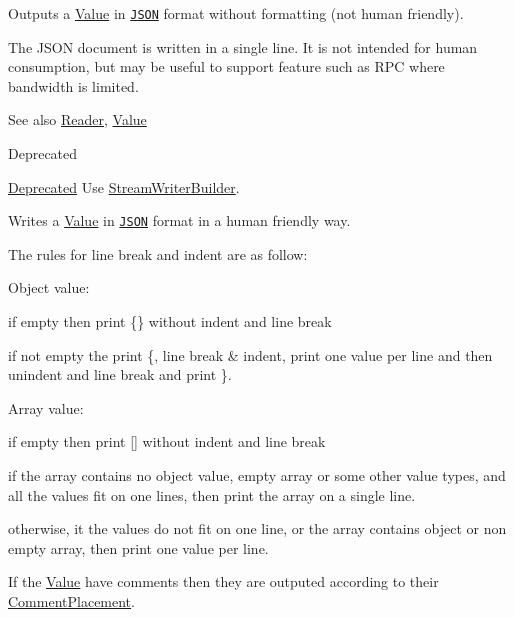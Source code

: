 Outputs a \hyperlink{classJson_1_1Value}{Value} in \href{http://www.json.org}{\tt J\+S\+ON} format without formatting (not human friendly). 

The J\+S\+ON document is written in a single line. It is not intended for \textquotesingle{}human\textquotesingle{} consumption, but may be useful to support feature such as R\+PC where bandwidth is limited. \begin{DoxySeeAlso}{See also}
\hyperlink{classJson_1_1Reader}{Reader}, \hyperlink{classJson_1_1Value}{Value} 
\end{DoxySeeAlso}
\begin{DoxyRefDesc}{Deprecated}
\item[\hyperlink{deprecated__deprecated000008}{Deprecated}]Use \hyperlink{classJson_1_1StreamWriterBuilder}{Stream\+Writer\+Builder}. \end{DoxyRefDesc}
Writes a \hyperlink{classJson_1_1Value}{Value} in \href{http://www.json.org}{\tt J\+S\+ON} format in a human friendly way.

The rules for line break and indent are as follow\+:
\begin{DoxyItemize}
\item Object value\+:
\begin{DoxyItemize}
\item if empty then print \{\} without indent and line break
\item if not empty the print \textquotesingle{}\{\textquotesingle{}, line break \& indent, print one value per line and then unindent and line break and print \textquotesingle{}\}\textquotesingle{}.
\end{DoxyItemize}
\item Array value\+:
\begin{DoxyItemize}
\item if empty then print \mbox{[}\mbox{]} without indent and line break
\item if the array contains no object value, empty array or some other value types, and all the values fit on one lines, then print the array on a single line.
\item otherwise, it the values do not fit on one line, or the array contains object or non empty array, then print one value per line.
\end{DoxyItemize}
\end{DoxyItemize}

If the \hyperlink{classJson_1_1Value}{Value} have comments then they are outputed according to their \hyperlink{namespaceJson_a4fc417c23905b2ae9e2c47d197a45351}{Comment\+Placement}.

